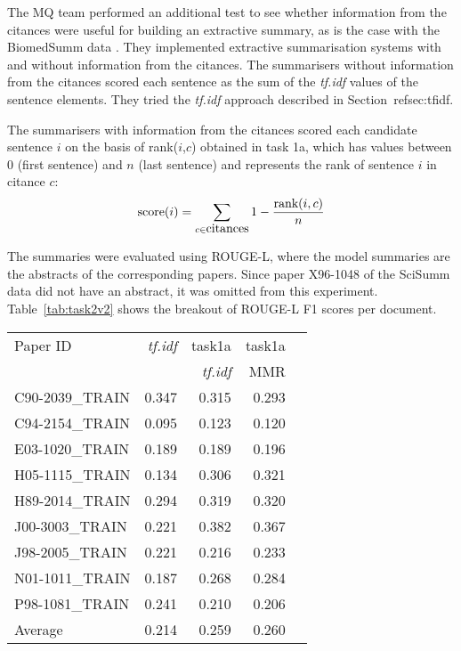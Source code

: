 \documentclass[11pt]{article}
\begin{document}
The MQ team performed an additional test to see  whether information from 
the citances were useful for building an extractive summary, as is the 
case with the BiomedSumm data \cite{Molla:ALTA2014}. They implemented 
extractive summarisation systems with and without information from the 
citances. 
The summarisers without information from the citances scored each sentence 
as the sum of the \emph{tf.idf} values of the sentence elements. They tried 
the \emph{tf.idf} approach described in Section~ref{sec:tfidf}.

The summarisers with information from the citances scored each candidate 
sentence $i$ on the basis of rank($i$,$c$) obtained in task 1a, which has 
values between 0 (first sentence) and $n$ (last sentence) and represents 
the rank of sentence $i$ in citance $c$:
$$
\hbox{score}(i) = \sum_{c\in\hbox{citances}}1-\frac{\hbox{rank}(i,c)}{n}
$$

The summaries were evaluated using ROUGE-L, where the model summaries are 
the abstracts of the corresponding papers. Since paper X96-1048 of 
the SciSumm data did not have an abstract, it was omitted from this 
experiment.
Table~\ref{tab:task2v2} shows the breakout of ROUGE-L F1 scores per document.

\begin{table*}
  \centering
  \begin{tabular}{|l|r|r|r|r|}
  \hline
	Paper ID & \emph{tf.idf} & task1a  & task1a \\
			&	&	\emph{tf.idf}		& MMR \\
	\hline
	C90-2039\_TRAIN & 0.347 & 0.315 & 0.293\\
	C94-2154\_TRAIN & 0.095 & 0.123 & 0.120\\
	E03-1020\_TRAIN & 0.189 & 0.189 & 0.196\\
	H05-1115\_TRAIN & 0.134 & 0.306 & 0.321\\
	H89-2014\_TRAIN & 0.294 & 0.319 & 0.320\\
	J00-3003\_TRAIN & 0.221 & 0.382 & 0.367\\
	J98-2005\_TRAIN & 0.221 & 0.216 & 0.233\\
	N01-1011\_TRAIN & 0.187 & 0.268 & 0.284\\
	P98-1081\_TRAIN & 0.241 & 0.210 & 0.206\\
	\hline
	Average & 0.214 & 0.259 & 0.260 \\
	\hline
  \end{tabular}
  \caption{ROUGE-L F1 results for summaries generated by the MQ system}
  \label{tab:task2v2}
\end{table*}
\end{document}
